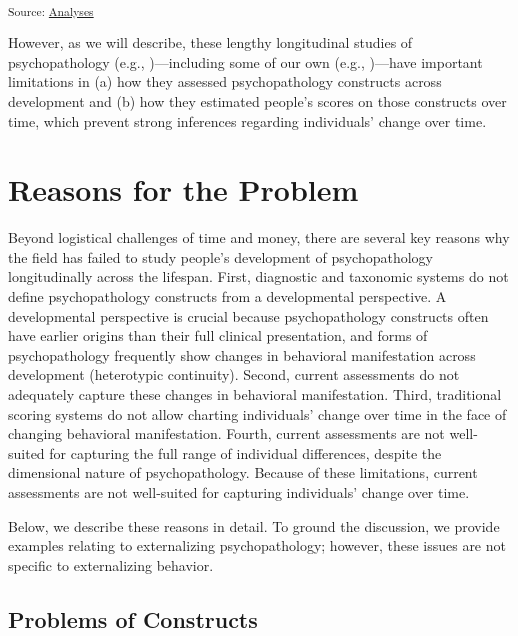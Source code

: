 \documentclass[
  american,
  letterpaper,
  12pt]{article}
\begin{document}
\textsubscript{Source:
\href{https://DevPsyLab.github.io/studying-psychopathology-development-lifespan/notebooks/analyses-preview.html\#cell-fig-longitudinal-externalizing-studies}{Analyses}}

However, as we will describe, these lengthy longitudinal studies of
psychopathology (e.g., )---including some of our own (e.g.,
)---have important
limitations in (a) how they assessed psychopathology constructs across
development and (b) how they estimated people's scores on those
constructs over time, which prevent strong inferences regarding
individuals' change over time.

\section{Reasons for the Problem}\label{reasons-for-the-problem}

Beyond logistical challenges of time and money, there are several key
reasons why the field has failed to study people's development of
psychopathology longitudinally across the lifespan. First, diagnostic
and taxonomic systems do not define psychopathology constructs from a
developmental perspective. A developmental perspective is crucial
because psychopathology constructs often have earlier origins than their
full clinical presentation, and forms of psychopathology frequently show
changes in behavioral manifestation across development (heterotypic
continuity). Second, current assessments do not adequately capture these
changes in behavioral manifestation. Third, traditional scoring systems
do not allow charting individuals' change over time in the face of
changing behavioral manifestation. Fourth, current assessments are not
well-suited for capturing the full range of individual differences,
despite the dimensional nature of psychopathology. Because of these
limitations, current assessments are not well-suited for capturing
individuals' change over time.

Below, we describe these reasons in detail. To ground the discussion, we
provide examples relating to externalizing psychopathology; however,
these issues are not specific to externalizing behavior.

\subsection{Problems of Constructs}\label{problems-of-constructs}
\end{document}
